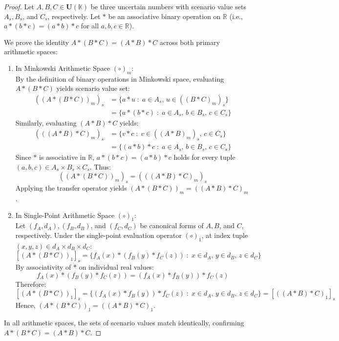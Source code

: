 \documentclass[a4paper,12pt, twoside]{memoir}
\newcommand{\tsbd}[1]{\mathbf{U}(\mathbb{#1})}
\newcommand{\kgdd}[1]{\left(#1\right)_1} %
\begin{document}
\begin{proof}
	Let $A, B, C \in \tsbd{K}$ be three uncertain numbers with scenario value sets $A_s, B_s$, and $C_s$, respectively. Let $*$ be an associative binary operation on $\mathbb{R}$ (i.e., $a * (b * c) = (a * b) * c$ for all $a, b, c \in \mathbb{R}$).

	We prove the identity $A * (B * C) = (A * B) * C$ across both primary arithmetic spaces:

	\begin{enumerate}[leftmargin=*]
		\item In Minkowski Arithmetic Space $(\circ)_m$: \\
		      By the definition of binary operations in Minkowski space, evaluating $A * (B * C)$ yields scenario value set:
		      \begin{align*}
			      ((A * (B * C))_m)_s & = \{a * u \;:\; a \in A_s, \, u \in ((B * C)_m)_s\}           \\
			                          & = \{a * (b * c) \;:\; a \in A_s, \, b \in B_s, \, c \in C_s\}
		      \end{align*}
		      Similarly, evaluating $(A * B) * C$ yields:
		      \begin{align*}
			      (( (A * B) * C)_m)_s & = \{v * c \;:\; v \in ((A * B)_m)_s, \, c \in C_s\}           \\
			                           & = \{(a * b) * c \;:\; a \in A_s, \, b \in B_s, \, c \in C_s\}
		      \end{align*}
		      Since $*$ is associative in $\mathbb{R}$, $a * (b * c) = (a * b) * c$ holds for every tuple $(a, b, c) \in A_s \times B_s \times C_s$. Thus:
		      \[
			      ((A * (B * C))_m)_s = (( (A * B) * C)_m)_s
		      \]
		      Applying the transfer operator yields $(A * (B * C))_m = ((A * B) * C)_m$.

		\item In Single-Point Arithmetic Space $(\circ)_1$: \\
		      Let $(f_A, d_A), (f_B, d_B)$, and $(f_C, d_C)$ be canonical forms of $A, B$, and $C$, respectively. Under the single-point evaluation operator $\kgdd{\circ}$, at index tuple $(x, y, z) \in d_A \times d_B \times d_C$:
		      \[
			      [\kgdd{A * (B * C)}]_s = \{f_A(x) * (f_B(y) * f_C(z)) \;:\; x \in d_A, \, y \in d_B, \, z \in d_C\}
		      \]
		      By associativity of $*$ on individual real values:
		      \[
			      f_A(x) * (f_B(y) * f_C(z)) = (f_A(x) * f_B(y)) * f_C(z)
		      \]
		      Therefore:
		      \[
			      [\kgdd{A * (B * C)}]_s = \{(f_A(x) * f_B(y)) * f_C(z) \;:\; x \in d_A, \, y \in d_B, \, z \in d_C\} = [\kgdd{(A * B) * C}]_s
		      \]
		      Hence, $\kgdd{A * (B * C)} = \kgdd{(A * B) * C}$.
	\end{enumerate}

	In all arithmetic spaces, the sets of scenario values match identically, confirming $A * (B * C) = (A * B) * C$.
\end{proof}
\end{document}
